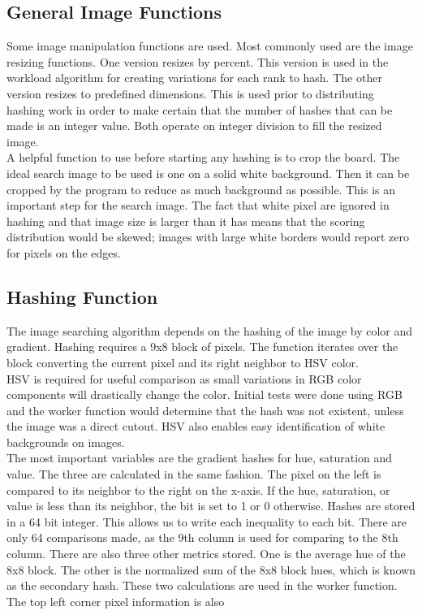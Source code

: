 \documentclass[10pt, journal]{vgtc}                %
\begin{document}
\subsection{General Image Functions}

Some image manipulation functions are used. Most commonly used are the image resizing functions. One version resizes by percent. This version is used in the workload algorithm for creating variations for each rank to hash. The other version resizes to predefined dimensions. This is used prior to distributing hashing work in order to make certain that the number of hashes that can be made is an integer value. Both operate on integer division to fill the resized image. \\
A helpful function to use before starting any hashing is to crop the board. The ideal search image to be used is one on a solid white background. Then it can be cropped by the program to reduce as much background as possible. This is an important step for the search image. The fact that white pixel are ignored in hashing and that image size is larger than it has means that the scoring distribution would be skewed; images with large white borders would report zero for pixels on the edges.

\subsection{Hashing Function}
\begin{flushleft}
	The image searching algorithm depends on the hashing of the image by color and gradient. Hashing requires a 9x8 block of pixels. The function iterates over the block converting the current pixel and its right neighbor to HSV color. \\\smallskip
HSV is required for useful comparison as small variations in RGB color components will drastically change the color. Initial tests were done using RGB and the worker function would determine that the hash was not existent, unless the image was a direct cutout. HSV also enables easy identification of white backgrounds on images.\\\smallskip
The most important variables are the gradient hashes for hue, saturation and value. The three are calculated in the same fashion. The pixel on the left is compared to its neighbor to the right on the x-axis. If the hue, saturation, or value is less than its neighbor, the bit is set to 1 or 0 otherwise. Hashes are stored in a 64 bit integer. This allows us to write each inequality to each bit. There are only 64 comparisons made, as the 9th column is used for comparing to the 8th column.
There are also three other metrics stored. One is the average hue of the 8x8 block. The other is the normalized sum of the 8x8 block hues, which is known as the secondary hash. These two calculations are used in the worker function. The top left corner pixel information is also 
\end{flushleft}
\end{document}
